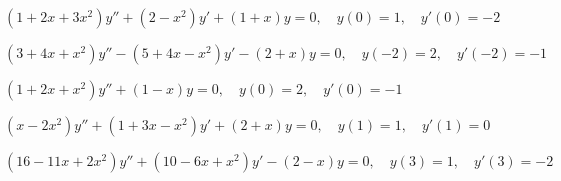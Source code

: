 \begin{exerciselist}
  \item\label{exer:7.3.45} \Cex $(1+2x+3x^{2})y''+(2-x^{2})y'+(1+x)y=0,\quad y(0)=1,\quad y'(0)=-2$

  \item\label{exer:7.3.46} \Cex
        $(3+4x+x^{2})y''-(5+4x-x^{2})y'-(2+x)y=0,\quad y(-2)=2,\quad y'(-2)=-1$

  \item\label{exer:7.3.47} \Cex $(1+2x+x^{2})y''+(1-x)y=0,\quad y(0)=2,\quad y'(0)=-1$

  \enlargethispage{1in}

  \item\label{exer:7.3.48} \Cex $(x-2x^{2})y''+(1+3x-x^{2})y'+(2+x)y=0,\quad y(1)=1,\quad y'(1)=0$

  \item\label{exer:7.3.49} \Cex
        $(16-11x+2x^{2})y''+(10-6x+x^{2})y'-(2-x)y=0,\quad y(3)=1,\quad y'(3)=-2$
\end{exerciselist}
